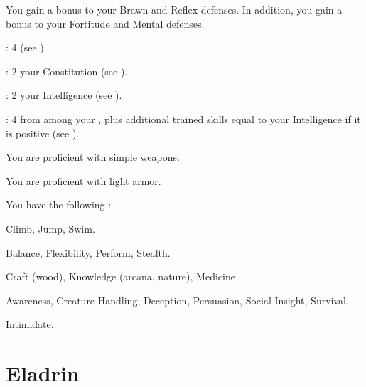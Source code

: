      You gain a  bonus to your Brawn and Reflex defenses.
      In addition, you gain a  bonus to your Fortitude and Mental defenses.

      \begin{raggeditemize}
          \item {}: 4 (see ).
          \item {}: 2 \add your Constitution (see ).
          \item {}: 2 \add your Intelligence (see ).
          \item {}: 4 from among your , plus additional trained skills equal to your Intelligence if it is positive (see ).
      \end{raggeditemize}

      You are proficient with simple weapons.

      You are proficient with light armor.

      You have the following :
      \begin{raggeditemize}
        \item {} Climb, Jump, Swim.
        \item {} Balance, Flexibility, Perform, Stealth.
        \item {} Craft (wood), Knowledge (arcana, nature), Medicine
        \item {} Awareness, Creature Handling, Deception, Persuasion, Social Insight, Survival.
        \item {} Intimidate.
      \end{raggeditemize}

\section{Eladrin}

